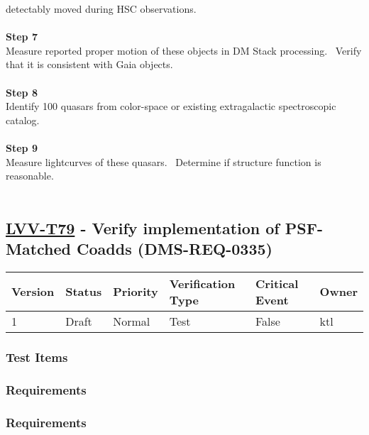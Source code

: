 detectably moved during HSC observations.\\
~\\
\textbf{Step 7}\\
Measure reported proper motion of these objects in DM Stack processing.
~Verify that it is consistent with Gaia objects.\\
~\\
\textbf{Step 8}\\
Identify 100 quasars from color-space or existing extragalactic
spectroscopic catalog.\\
~\\
\textbf{Step 9}\\
Measure lightcurves of these quasars. ~Determine if structure function
is reasonable.\\
~\\

\hypertarget{lvv-t79---verify-implementation-of-psf-matched-coadds-dms-req-0335}{%
\subsection{\texorpdfstring{\href{https://jira.lsstcorp.org/secure/Tests.jspa\#/testCase/LVV-T79}{LVV-T79}
- Verify implementation of PSF-Matched Coadds
(DMS-REQ-0335)}{LVV-T79 - Verify implementation of PSF-Matched Coadds (DMS-REQ-0335)}}\label{lvv-t79---verify-implementation-of-psf-matched-coadds-dms-req-0335}}

\begin{longtable}[]{@{}llllll@{}}
\toprule
Version & Status & Priority & Verification Type & Critical Event &
Owner\tabularnewline
\midrule
\endhead
1 & Draft & Normal & Test & False & ktl\tabularnewline
\bottomrule
\end{longtable}

\hypertarget{test-items-34}{%
\subsubsection{Test Items}\label{test-items-34}}

\hypertarget{requirements-68}{%
\subsubsection{Requirements}\label{requirements-68}}

\hypertarget{requirements-69}{%
\subsubsection{Requirements}\label{requirements-69}}

